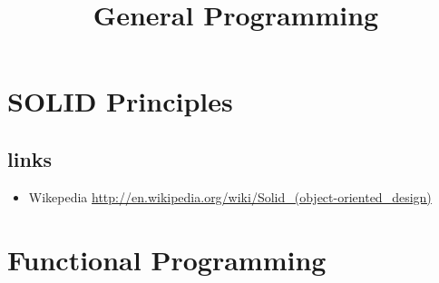 \documentclass {amsart}
\title{General Programming}
\begin{document}
\section{SOLID Principles}
	\subsection{links}
		\begin{itemize}
			\item Wikepedia \url{http://en.wikipedia.org/wiki/Solid_(object-oriented_design)}
		\end{itemize}

\section{Functional Programming}
\end{document}

